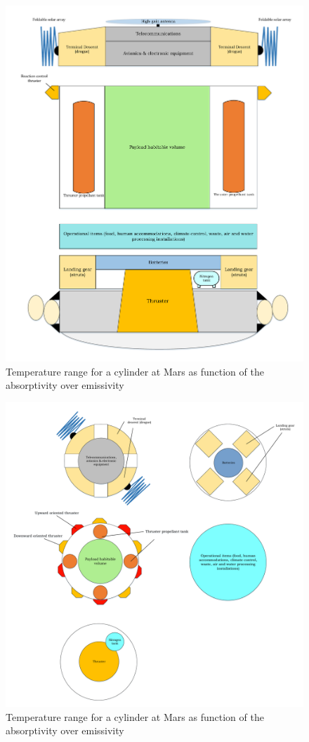 \begin{figure}[h]
		\centering
		\includegraphics[width=1.0\textwidth]{./Figure/CrewModule/Axialview.pdf}
		\caption{Temperature range for a cylinder at Mars as function of the absorptivity over emissivity}
		\label{fig:tanktemp}
\end{figure}

\begin{figure}[h]
		\centering
		\includegraphics[width=1.0\textwidth]{./Figure/CrewModule/TopviewV2.pdf}
		\caption{Temperature range for a cylinder at Mars as function of the absorptivity over emissivity}
		\label{fig:tanktemp}
\end{figure}